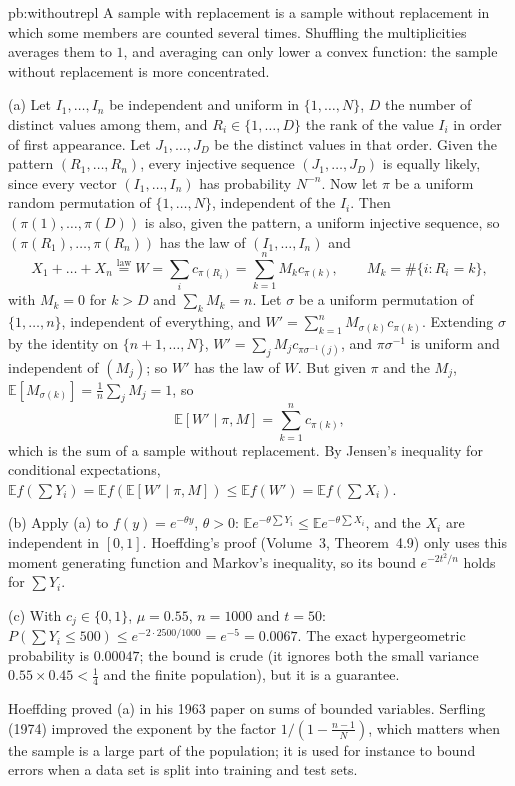 \begin{solution}{pb:withoutrepl}
\idea A sample with replacement is a sample without replacement in which some members are counted several times. Shuffling the multiplicities averages them to $1$, and
averaging can only lower a convex function: the sample without replacement is more concentrated.

\writeup (a) Let $I_1,\dots,I_n$ be independent and uniform in $\{1,\dots,N\}$, $D$ the number of distinct values among them, and $R_i\in\{1,\dots,D\}$ the rank of the value $I_i$
in order of first appearance. Let $J_1,\dots,J_D$ be the distinct values in that order. Given the pattern $(R_1,\dots,R_n)$, every injective sequence $(J_1,\dots,J_D)$ is equally
likely, since every vector $(I_1,\dots,I_n)$ has probability $N^{-n}$. Now let $\pi$ be a uniform random permutation of $\{1,\dots,N\}$, independent of the $I_i$. Then
$(\pi(1),\dots,\pi(D))$ is also, given the pattern, a uniform injective sequence, so $(\pi(R_1),\dots,\pi(R_n))$ has the law of $(I_1,\dots,I_n)$ and
\[
X_1+\dots+X_n\overset{\text{law}}=W=\sum_ic_{\pi(R_i)}=\sum_{k=1}^nM_kc_{\pi(k)},\qquad M_k=\#\{i:R_i=k\},
\]
with $M_k=0$ for $k>D$ and $\sum_kM_k=n$. Let $\sigma$ be a uniform permutation of $\{1,\dots,n\}$, independent of everything, and $W'=\sum_{k=1}^nM_{\sigma(k)}c_{\pi(k)}$. Extending
$\sigma$ by the identity on $\{n+1,\dots,N\}$, $W'=\sum_jM_jc_{\pi\sigma^{-1}(j)}$, and $\pi\sigma^{-1}$ is uniform and independent of $(M_j)$; so $W'$ has the law of $W$. But given
$\pi$ and the $M_j$, $\mathbb E[M_{\sigma(k)}]=\frac1n\sum_jM_j=1$, so
\[
\mathbb E[W'\mid\pi,M]=\sum_{k=1}^nc_{\pi(k)},
\]
which is the sum of a sample without replacement. By Jensen's inequality for conditional expectations, $\mathbb Ef(\sum Y_i)=\mathbb Ef(\mathbb E[W'\mid\pi,M])\le\mathbb Ef(W')=\mathbb Ef(\sum X_i)$.

(b) Apply (a) to $f(y)=e^{-\theta y}$, $\theta>0$: $\mathbb Ee^{-\theta\sum Y_i}\le\mathbb Ee^{-\theta\sum X_i}$, and the $X_i$ are independent in $[0,1]$. Hoeffding's proof (Volume~3,
Theorem~4.9) only uses this moment generating function and Markov's inequality, so its bound $e^{-2t^2/n}$ holds for $\sum Y_i$.

(c) With $c_j\in\{0,1\}$, $\mu=0.55$, $n=1000$ and $t=50$: $P(\sum Y_i\le500)\le e^{-2\cdot2500/1000}=e^{-5}=0.0067$. The exact hypergeometric probability is $0.00047$; the bound
is crude (it ignores both the small variance $0.55\times0.45<\frac14$ and the finite population), but it is a guarantee.

\leads Hoeffding proved (a) in his 1963 paper on sums of bounded variables. Serfling (1974) improved the exponent by the factor $1/(1-\frac{n-1}N)$, which matters when the sample
is a large part of the population; it is used for instance to bound errors when a data set is split into training and test sets.
\end{solution}

